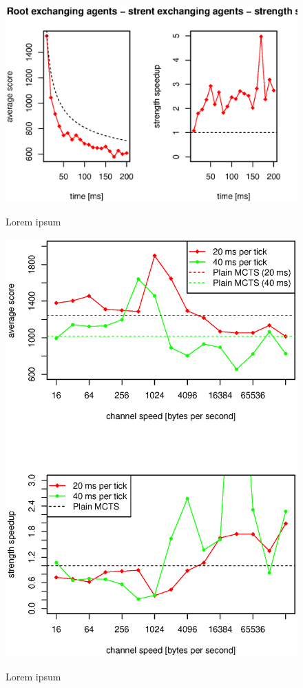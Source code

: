 \begin{figure}
\begin{center}
\includegraphics{img/root-exchange-strength.eps}
\end{center}
\caption{\footnotesize Lorem ipsum}{\footnotesize }
\label{fig_root_exchanging_strength}
\end{figure}

\begin{figure}
\begin{center}
\includegraphics{img/root-exchange-channel-speed.eps}
\end{center}
\caption{\footnotesize Lorem ipsum}{\footnotesize }
\label{fig_root_exchanging_channel_speed}
\end{figure}




